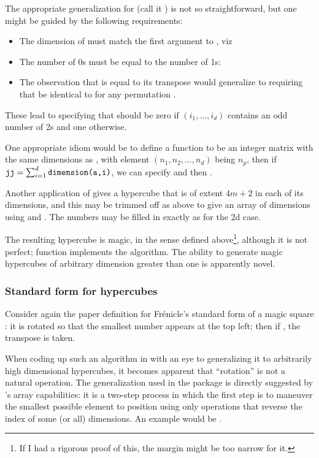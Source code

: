 \documentclass[nojss]{jss}
\begin{document}
The appropriate generalization for  (call it )
is not so straightforward, but one might be guided by the following
requirements:
\begin{itemize}
\item The dimension of  must match the first argument to
  , viz 
\item The number of 0s must be equal to the number of 1s:
\item The observation that  is equal to its transpose
would generalize to requiring that  be
identical to  for any permutation .
\end{itemize}
These lead to specifying that  should be zero if
$(i_1,\ldots,i_d)$ contains an odd number of 2s and one otherwise.

One appropriate  idiom would be to define a function
 to be an integer matrix with the same dimensions
as , with element $(n_1,n_2, ..., n_d)$ being $n_p$, then if
$\mbox{\texttt{jj}}=\sum_{i=1}^d\mbox{\texttt{dimension(a,i)}}$, we can specify
 and then .

Another application of  gives a hypercube that is of
extent $4m+2$ in each of its  dimensions, and this may be
trimmed off as above to give an array of dimensions 
using  and \code{[<-}.  The numbers may be filled in
exactly as for the 2d case.

The resulting hypercube is magic, in the sense defined
above\footnote{If I had a rigorous proof of this, the margin might be
too narrow for it.}, although it is not perfect; function
 implements the algorithm.  The ability to
generate magic hypercubes of arbitrary dimension greater than one is
apparently novel.

\subsubsection{Standard form for hypercubes}
Consider again the paper definition for Fr\'{e}nicle's standard form
of a magic square : it is rotated so that the smallest number
appears at the top left; then if , the transpose
is taken.

When coding up such an algorithm in  with an eye to generalizing it
to arbitrarily high dimensional hypercubes, it becomes apparent that
``rotation'' is not a natural operation.  The generalization used in
the package is directly suggested by 's array capabilities: it is
a two-step process in which the first step is to maneuver the smallest
possible element to position \code{[1,1,...,1]} using only operations
that reverse the index of some (or all) dimensions.  An example would
be .
\end{document}
